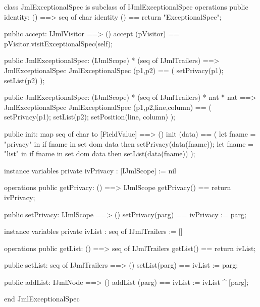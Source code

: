 \begin{vdm_al}
class JmlExceptionalSpec is subclass of IJmlExceptionalSpec
operations
  public identity: () ==> seq of char
  identity () == return "ExceptionalSpec";

  public accept: IJmlVisitor ==> ()
  accept (pVisitor) == pVisitor.visitExceptionalSpec(self);

  public JmlExceptionalSpec:
    (IJmlScope) *
    (seq of IJmlTrailers) ==> JmlExceptionalSpec
  JmlExceptionalSpec (p1,p2) == 
    ( setPrivacy(p1);
      setList(p2) );

  public JmlExceptionalSpec:
    (IJmlScope) *
    (seq of IJmlTrailers) *
    nat *
    nat ==> JmlExceptionalSpec
  JmlExceptionalSpec (p1,p2,line,column) == 
    ( setPrivacy(p1);
      setList(p2);
      setPosition(line, column) );

  public init: map seq of char to [FieldValue] ==> ()
  init (data) ==
    ( let fname = "privacy" in
        if fname in set dom data
        then setPrivacy(data(fname));
      let fname = "list" in
        if fname in set dom data
        then setList(data(fname)) );

instance variables
  private ivPrivacy : [IJmlScope] := nil

operations
  public getPrivacy: () ==> IJmlScope
  getPrivacy() == return ivPrivacy;

  public setPrivacy: IJmlScope ==> ()
  setPrivacy(parg) == ivPrivacy := parg;

instance variables
  private ivList : seq of IJmlTrailers := []

operations
  public getList: () ==> seq of IJmlTrailers
  getList() == return ivList;

  public setList: seq of IJmlTrailers ==> ()
  setList(parg) == ivList := parg;

  public addList: IJmlNode ==> ()
  addList (parg) == ivList := ivList ^ [parg];

end JmlExceptionalSpec
\end{vdm_al}

